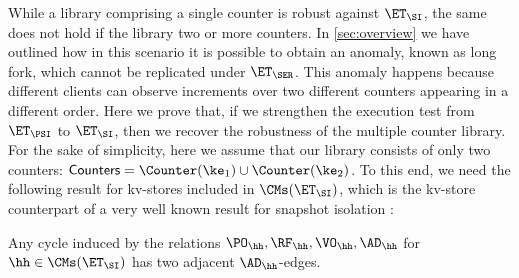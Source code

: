 While a library comprising a single counter is robust against 
$\ET_{\SI}$, the same does not hold if the library two or more counters. 
In \cref{sec:overview} we have outlined how in this scenario it is 
possible to obtain an anomaly, known as long fork, which cannot be 
replicated under $\ET_{\SER}$. 
This anomaly happens because different clients can observe increments 
over two different counters appearing in a different order. Here we prove 
that, if we strengthen the execution test from $\ET_{\PSI}$ to $\ET_{\SI}$, 
then we recover the robustness of the multiple counter library. For the 
sake of simplicity, here we assume that our library consists of only two 
counters: $\mathsf{Counters} = \Counter(\ke_1) \cup \Counter(\ke_2)$.
To this end, we need the following result for kv-stores included in $\CMs(\ET_{\SI})$, 
which is the kv-store counterpart of a very well known result for snapshot isolation 
\cite{feketeSI,SIanalysis}: 
\begin{theorem}
\label{thm:si_cycles}
Any cycle induced by the relations $\PO_{\hh}, \RF_{\hh}, \VO_{\hh}, \AD_{\hh}$ 
for $\hh \in \CMs(\ET_{\SI})$ has two adjacent $\AD_{\hh}$-edges.
\end{theorem}

